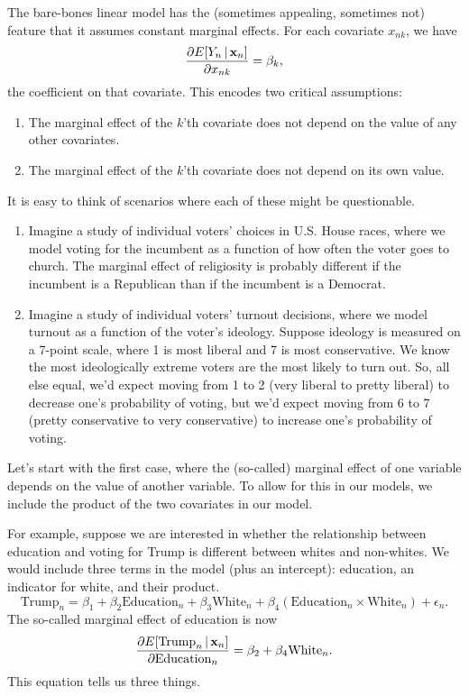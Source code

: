 \documentclass[12pt,oneside,openany]{book}
\begin{document}
The bare-bones linear model has the (sometimes appealing, sometimes not)
feature that it assumes constant marginal effects. For each covariate
\(x_{nk}\), we have \[
\frac{\partial E[Y_n \,|\, \mathbf{x}_n]}{\partial x_{nk}} = \beta_k,
\] the coefficient on that covariate. This encodes two critical
assumptions:

\begin{enumerate}
\def\labelenumi{\arabic{enumi}.}
\item
  The marginal effect of the \(k\)'th covariate does not depend on the
  value of any other covariates.
\item
  The marginal effect of the \(k\)'th covariate does not depend on its
  own value.
\end{enumerate}

It is easy to think of scenarios where each of these might be
questionable.

\begin{enumerate}
\def\labelenumi{\arabic{enumi}.}
\item
  Imagine a study of individual voters' choices in U.S. House races,
  where we model voting for the incumbent as a function of how often the
  voter goes to church. The marginal effect of religiosity is probably
  different if the incumbent is a Republican than if the incumbent is a
  Democrat.
\item
  Imagine a study of individual voters' turnout decisions, where we
  model turnout as a function of the voter's ideology. Suppose ideology
  is measured on a 7-point scale, where 1 is most liberal and 7 is most
  conservative. We know the most ideologically extreme voters are the
  most likely to turn out. So, all else equal, we'd expect moving from 1
  to 2 (very liberal to pretty liberal) to decrease one's probability of
  voting, but we'd expect moving from 6 to 7 (pretty conservative to
  very conservative) to increase one's probability of voting.
\end{enumerate}

Let's start with the first case, where the (so-called) marginal effect
of one variable depends on the value of another variable. To allow for
this in our models, we include the product of the two covariates in our
model.

For example, suppose we are interested in whether the relationship
between education and voting for Trump is different between whites and
non-whites. We would include three terms in the model (plus an
intercept): education, an indicator for white, and their product. \[
\text{Trump}_n = \beta_1 + \beta_2 \text{Education}_n + \beta_3 \text{White}_n + \beta_4 (\text{Education}_n \times \text{White}_n) + \epsilon_n.
\] The so-called marginal effect of education is now \[
\frac{\partial E[\text{Trump}_n \,|\, \mathbf{x}_n]}{\partial \text{Education}_n}
= \beta_2 + \beta_4 \text{White}_n.
\] This equation tells us three things.
\end{document}
